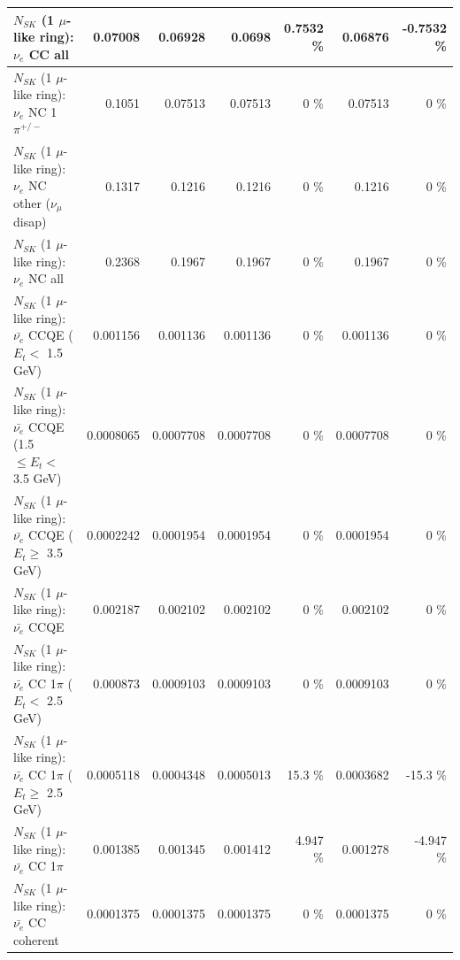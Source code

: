 \begin{table}
\begin{tabular}{| l | r | r | r  r | r  r |}
                                  $N_{SK}$ (1 $\mu$-like ring): $\nu_{e}$ CC all &         0.07008 &         0.06928 &          0.0698 &   0.7532 \%  &         0.06876 &  -0.7532 \%  \\ 
\hline
                           $N_{SK}$ (1 $\mu$-like ring): $\nu_e$ NC 1$\pi^{+/-}$ &          0.1051 &         0.07513 &         0.07513 &        0 \%  &         0.07513 &        0 \%  \\ 
                $N_{SK}$ (1 $\mu$-like ring): $\nu_e$ NC other ($\nu_\mu$ disap) &          0.1317 &          0.1216 &          0.1216 &        0 \%  &          0.1216 &        0 \%  \\ 
                                  $N_{SK}$ (1 $\mu$-like ring): $\nu_{e}$ NC all &          0.2368 &          0.1967 &          0.1967 &        0 \%  &          0.1967 &        0 \%  \\ 
\hline
\hline
\hline
            $N_{SK}$ (1 $\mu$-like ring): $\bar{\nu_e}$ CCQE ($E_{t} <$ 1.5 GeV) &        0.001156 &        0.001136 &        0.001136 &        0 \%  &        0.001136 &        0 \%  \\ 
   $N_{SK}$ (1 $\mu$-like ring): $\bar{\nu_e}$ CCQE (1.5 $\leq E_{t} <$ 3.5 GeV) &       0.0008065 &       0.0007708 &       0.0007708 &        0 \%  &       0.0007708 &        0 \%  \\ 
         $N_{SK}$ (1 $\mu$-like ring): $\bar{\nu_e}$ CCQE ($E_{t} \geq$ 3.5 GeV) &       0.0002242 &       0.0001954 &       0.0001954 &        0 \%  &       0.0001954 &        0 \%  \\ 
\hline
                                $N_{SK}$ (1 $\mu$-like ring): $\bar{\nu_e}$ CCQE &        0.002187 &        0.002102 &        0.002102 &        0 \%  &        0.002102 &        0 \%  \\ 
\hline
       $N_{SK}$ (1 $\mu$-like ring): $\bar{\nu_e}$ CC 1$\pi$ ($E_{t} <$ 2.5 GeV) &        0.000873 &       0.0009103 &       0.0009103 &        0 \%  &       0.0009103 &        0 \%  \\ 
    $N_{SK}$ (1 $\mu$-like ring): $\bar{\nu_e}$ CC 1$\pi$ ($E_{t} \geq$ 2.5 GeV) &       0.0005118 &       0.0004348 &       0.0005013 &     15.3 \%  &       0.0003682 &    -15.3 \%  \\ 
\hline
                           $N_{SK}$ (1 $\mu$-like ring): $\bar{\nu_e}$ CC 1$\pi$ &        0.001385 &        0.001345 &        0.001412 &    4.947 \%  &        0.001278 &   -4.947 \%  \\ 
                         $N_{SK}$ (1 $\mu$-like ring): $\bar{\nu_e}$ CC coherent &       0.0001375 &       0.0001375 &       0.0001375 &        0 \%  &       0.0001375 &        0 \%  \\ 

\end{tabular}
\end{table}
